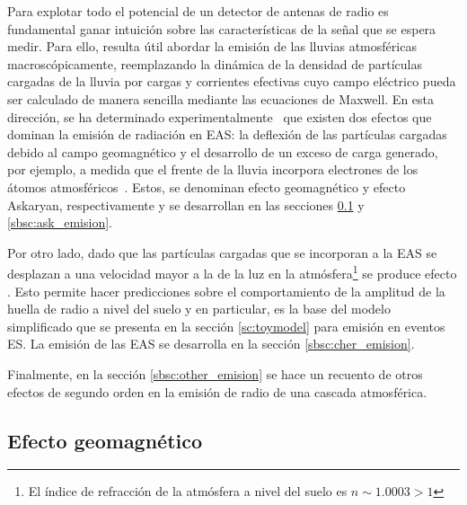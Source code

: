 Para explotar todo el potencial de un detector de antenas de radio es fundamental ganar intuici\'on sobre las caracter\'isticas de la se\~nal que se espera medir.
Para ello, resulta \'util abordar la emisi\'on de las lluvias atmosf\'ericas macrosc\'opicamente, reemplazando la din\'amica de la densidad de part\'iculas cargadas de la lluvia por cargas y corrientes efectivas cuyo campo el\'ectrico pueda ser calculado de manera sencilla mediante las ecuaciones de Maxwell.
En esta direcci\'on, se ha determinado experimentalmente~\cite{ardouin2009radio,huege2012lopes,horandel2009lofar,schroder2013tunka,kelley2011aera} que existen dos efectos que dominan la emisi\'on de radiaci\'on en EAS: la deflexi\'on de las part\'iculas cargadas debido al campo geomagn\'etico y el desarrollo de un exceso de carga generado, por ejemplo, a medida que el frente de la lluvia incorpora electrones de los \'atomos atmosf\'ericos~\cite{scholten:2008}.
Estos, se denominan efecto geomagn\'etico y efecto Askaryan, respectivamente y se desarrollan en las secciones \ref{sbsc:geom_emision} y \ref{sbsc:ask_emision}.

Por otro lado, dado que las part\'iculas cargadas que se incorporan a la EAS se desplazan a una velocidad mayor a la de la luz en la atm\'osfera\footnote{El \'indice de refracci\'on de la atm\'osfera a nivel del suelo es $n\sim1.0003>1$} se produce efecto \cher{}.
Esto permite hacer predicciones sobre el comportamiento de la amplitud de la huella de radio a nivel del suelo y en particular, es la base del modelo simplificado que se presenta en la secci\'on \ref{sc:toymodel} para emisi\'on en eventos ES. 
La emisi\'on \cher{} de las EAS se desarrolla en la secci\'on \ref{sbsc:cher_emision}.

Finalmente, en la secci\'on \ref{sbsc:other_emision} se hace un recuento de otros efectos de segundo orden en la emisi\'on de radio de una cascada atmosf\'erica.

\subsection{Efecto geomagn\'etico}
\label{sbsc:geom_emision}
	
